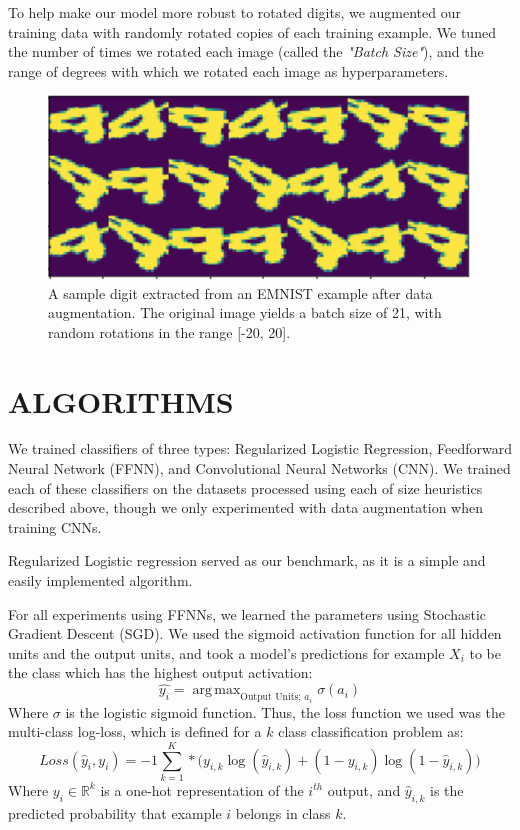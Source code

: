 \documentclass[letterpaper, 10 pt, conference]{ieeeconf}  %
\DeclareMathOperator*{\argmax}{arg\,max}
\begin{document}
To help make our model more robust to rotated digits, we augmented our training data with randomly rotated copies of each training example. We tuned the number of times we rotated each image (called the \emph{"Batch Size"}), and the range of degrees with which we rotated each image as hyperparameters. 

\begin{figure}[H]
      \centering
      \includegraphics[scale = 1]{rotated_nines}
		\centering
      \caption{A sample digit extracted from an EMNIST example after data augmentation. The original image yields a batch size of 21, with random rotations in the range [-20, 20].}
      \label{figurelabel}
   \end{figure}


\section{ALGORITHMS}

We trained classifiers of three types: Regularized Logistic Regression, Feedforward Neural Network (FFNN), and Convolutional Neural Networks (CNN). We trained each of these classifiers on the datasets processed using each of size heuristics described above, though we only experimented with data augmentation when training CNNs.

Regularized Logistic regression served as our benchmark, as it is a simple and easily implemented algorithm. 

For all experiments using FFNNs, we learned the parameters using Stochastic Gradient Descent (SGD). We used the sigmoid activation function for all hidden units and the output units, and took a model's predictions for example $X_i$ to be the class which has the highest output activation:
$$
\hat{y_i} = \argmax_{\text{Output Units; } a_i}{\sigma(a_i)}
$$
Where $\sigma$ is the logistic sigmoid function. Thus, the loss function we used was the multi-class log-loss, which is defined for a $k$ class classification problem as:
$$
Loss(\hat{y}_i, y_i) = -1\sum_{k = 1}^K*\big( y_{i,k}\log(\hat{y}_{i,k}) + (1 - y_{i,k})\log(1 - \hat{y}_{i,k}))
$$
Where $y_{i} \in \mathbb{R}^k$ is a one-hot representation of the $i^{th}$ output, and $\hat{y}_{i,k}$ is the predicted probability that example $i$ belongs in class $k$. 
\end{document}
